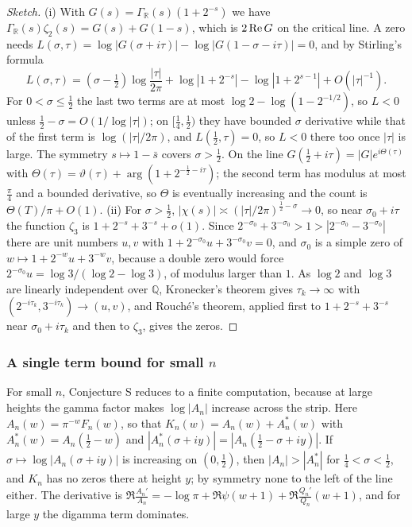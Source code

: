 \begin{proof}[Sketch]
(i) With $G(s)=\Gamma_{\mathbb R}(s)(1+2^{-s})$ we have $\Gamma_{\mathbb R}(s)\zeta_2(s)=G(s)+G(1-s)$, which is $2\operatorname{Re} G$ on the critical line. A zero needs $L(\sigma,\tau)=\log|G(\sigma+i\tau)|-\log|G(1-\sigma-i\tau)|=0$, and by Stirling's formula
\[
L(\sigma,\tau)=(\sigma-\tfrac12)\log\frac{|\tau|}{2\pi}+\log|1+2^{-s}|-\log|1+2^{s-1}|+O(|\tau|^{-1}).
\]
For $0<\sigma\le\frac12$ the last two terms are at most $\log2-\log(1-2^{-1/2})$, so $L<0$ unless $\frac12-\sigma=O(1/\log|\tau|)$; on $[\frac14,\frac12)$ they have bounded $\sigma$ derivative while that of the first term is $\log(|\tau|/2\pi)$, and $L(\frac12,\tau)=0$, so $L<0$ there too once $|\tau|$ is large. The symmetry $s\mapsto1-\bar s$ covers $\sigma>\frac12$. On the line $G(\frac12+i\tau)=|G|e^{i\Theta(\tau)}$ with $\Theta(\tau)=\vartheta(\tau)+\arg(1+2^{-\frac12-i\tau})$; the second term has modulus at most $\frac\pi4$ and a bounded derivative, so $\Theta$ is eventually increasing and the count is $\Theta(T)/\pi+O(1)$.
(ii) For $\sigma>\frac12$, $|\chi(s)|\asymp(|\tau|/2\pi)^{\frac12-\sigma}\to0$, so near $\sigma_0+i\tau$ the function $\zeta_3$ is $1+2^{-s}+3^{-s}+o(1)$. Since $2^{-\sigma_0}+3^{-\sigma_0}>1>|2^{-\sigma_0}-3^{-\sigma_0}|$ there are unit numbers $u,v$ with $1+2^{-\sigma_0}u+3^{-\sigma_0}v=0$, and $\sigma_0$ is a simple zero of $w\mapsto1+2^{-w}u+3^{-w}v$, because a double zero would force $2^{-\sigma_0}u=\log3/(\log2-\log3)$, of modulus larger than $1$. As $\log2$ and $\log3$ are linearly independent over $\mathbb Q$, Kronecker's theorem gives $\tau_k\to\infty$ with $(2^{-i\tau_k},3^{-i\tau_k})\to(u,v)$, and Rouch\'e's theorem, applied first to $1+2^{-s}+3^{-s}$ near $\sigma_0+i\tau_k$ and then to $\zeta_3$, gives the zeros.
\end{proof}

\subsubsection{A single term bound for small \texorpdfstring{$n$}{n}}

For small $n$, Conjecture S reduces to a finite computation, because at large heights the gamma factor makes $\log|A_n|$ increase across the strip. Here $A_n(w)=\pi^{-w}F_n(w)$, so that $K_n(w)=A_n(w)+A_n^*(w)$ with $A_n^*(w)=A_n(\frac12-w)$ and $|A_n^*(\sigma+iy)|=|A_n(\frac12-\sigma+iy)|$. If $\sigma\mapsto\log|A_n(\sigma+iy)|$ is increasing on $(0,\frac12)$, then $|A_n|>|A_n^*|$ for $\frac14<\sigma<\frac12$, and $K_n$ has no zeros there at height $y$; by symmetry none to the left of the line either. The derivative is $\Re\frac{A_n'}{A_n}=-\log\pi+\Re\psi(w+1)+\Re\frac{Q_n'}{Q_n}(w+1)$, and for large $y$ the digamma term dominates.

